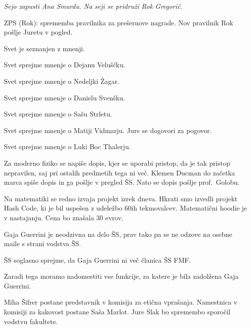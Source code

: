\documentclass{seja}
\begin{document}
\begin{ad}
\textit{Sejo zapusti Ana Smurdu. Na seji se pridruži Rok Gregorič.}

ZPS (Rok): sprememba pravilnika za prešernove nagrade. Nov pravilnik Rok pošlje Juretu v pogled.

\item
Svet je seznanjen z mnenji.

\begin{sklep*}
Svet sprejme mnenje o Dejanu Veluščku.
\end{sklep*}
\begin{sklep*}
Svet sprejme mnenje o Nedeljki Žagar.
\end{sklep*}
\begin{sklep*}
Svet sprejme mnenje o Danielu Svenšku.
\end{sklep*}
\begin{sklep*}
Svet sprejme mnenje o Sašu Strletu.
\end{sklep*}
\begin{sklep*}
Svet sprejme mnenje o Matiji Vidmarju. Jure se dogovori za pogovor.
\end{sklep*}
\begin{sklep*}
Svet sprejme mnenje o Luki Boc Thalerju.
\end{sklep*}

\item
Za moderno fiziko se napiše dopis, kjer se uporabi pristop, da je tak pristop nepravilen, saj pri ostalih predmetih tega ni več. Klemen Ducman do začetka marca spiše dopis in ga pošlje v pregled ŠS. Nato se dopis pošlje prof.\ Golobu.

\item
Na matematiki se redno izvaja projekt izrek dneva. Hkrati smo izvedli projekt Hash Code, ki je bil uspešen z udeležbo 60ih tekmovalcev.
Matematični hoodie je v nastajanju. Cena bo znašala 30 evrov.

\item
Gaja Guerrini je neodzivna na delo ŠS, prav tako pa se ne odzove na osebne maile s strani vodstva ŠS.

\begin{sklep*}
ŠS soglasno sprejme, da Gaja Guerrini ni več članica ŠS FMF.
\end{sklep*}

Zaradi tega moramo nadomestiti vse funkcije, za katere je bila zadolžena Gaja Guerrini.

\begin{sklep*}
Miha Šifrer postane predstavnik v komisija za etična vprašanja.
Namestnica v komisiji za kakovost postane Saša Marlot.
Jure Slak bo spremembo sporočil vodstvu fakultete.
\end{sklep*}

\end{ad}
\end{document}
